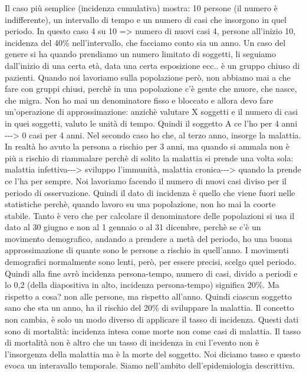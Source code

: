 Il caso più semplice (incidenza cumulativa) mostra: 10 persone (il
numero è indifferente), un intervallo di tempo e un numero di casi che
insorgono in quel periodo. In questo caso 4 su 10 =\textgreater{} numero
di nuovi casi 4, persone all'inizio 10, incidenza del 40\%
nell'intervallo, che facciamo conto sia un anno. Un caso del genere si
ha quando prendiamo un numero limitato di soggetti, li seguiamo
dall'inizio di una certa età, data una certa esposizione ecc.. è un
gruppo chiuso di pazienti. Quando noi lavoriamo sulla popolazione però,
non abbiamo mai a che fare con gruppi chiusi, perchè in una popolazione
c'è gente che muore, che nasce, che migra. Non ho mai un denominatore
fisso e bloccato e allora devo fare un'operazione di approssimazione:
anzichè valutare X soggetti e il numero di casi in quei soggetti, valuto
le unità di tempo. Quindi il soggetto A ce l'ho per 4 anni
-\/-\/-\textgreater{} 0 casi per 4 anni. Nel secondo caso ho che, al
terzo anno, insorge la malattia. In realtà ho avuto la persona a rischio
per 3 anni, ma quando si ammala non è più a rischio di riammalare perchè
di solito la malattia si prende una volta sola: malattia
infettiva-\/-\/-\textgreater{} sviluppo l'immunità, malattia
cronica-\/-\/-\textgreater{} quando la prende ce l'ha per sempre. Noi
lavoriamo facendo il numero di nuovi casi diviso per il periodo di
osservazione. Quindi il dato di incidenza è quello che viene fuori nelle
statistiche perchè, quando lavoro su una popolazione, non ho mai la
coorte stabile. Tanto è vero che per calcolare il denominatore delle
popolazioni si usa il dato al 30 giugno e non al 1 gennaio o al 31
dicembre, perchè se c'è un movimento demografico, andando a prendere a
metà del periodo, ho una buona approssimazione di quante sono le persone
a rischio in quell'anno. I movimenti demografici normalmente sono lenti,
però, per essere precisi, scelgo quel periodo. Quindi alla fine avrò
incidenza persona-tempo, numero di casi, divido a periodi e lo 0,2
(della diapositiva in alto, incidenza persona-tempo) significa 20\%. Ma
rispetto a cosa? non alle persone, ma rispetto all'anno. Quindi ciascun
soggetto sano che sta un anno, ha il rischio del 20\% di sviluppare la
malattia. Il concetto non cambia, è solo un modo diverso di applicare il
tasso di incidenza. Questi dati sono di mortalità: incidenza intesa come
morte non come casi di malattia. Il tasso di mortalità non è altro che
un tasso di incidenza in cui l'evento non è l'insorgenza della malattia
ma è la morte del soggetto. Noi diciamo tasso e questo evoca un
interavallo temporale. Siamo nell'ambito dell'epidemiologia descrittiva.

